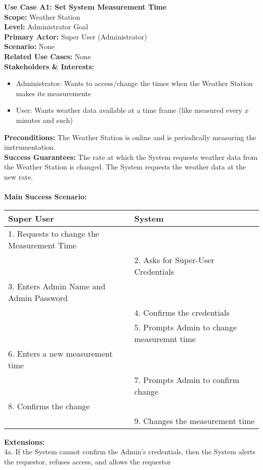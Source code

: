 \documentclass[letterpaper]{article}
\begin{document}
\noindent
\textbf{Use Case A1:  Set System Measurement Time}\\
\textbf{Scope:  }Weather Station\\
\textbf{Level:  }Administrator Goal\\
\textbf{Primary Actor:  }Super User (Administrator)\\
\textbf{Scenario:  }None\\
\textbf{Related Use Cases:  }None\\
\textbf{Stakeholders \& Interests:  }
\begin{itemize}
\item Administrator:  Wants to access/change the times when the
Weather Station makes its measurements
\item User:  Wants weather data available at a time frame (like
measured every $x$ minutes and such)
\end{itemize}
\textbf{Preconditions:  }The Weather Station is online and is
periodically measuring the instrumentation.\\
\textbf{Success Guarantees:  }The rate at which the System requests
weather data from the Weather Station is changed.  The System
requests the weather data at the new rate.\\\\ 
\textbf{Main Success Scenario:  }\\
\begin{tabular}{|p{6cm}|p{6cm}|}\hline
\textbf{Super User} & \textbf{System}\\\hline
1.  Requests to change the Measurement Time &\\\hline
& 2.  Asks for Super-User Credentials\\\hline
3.  Enters Admin Name and Admin Password & \\\hline
& 4.  Confirms the credentials\\\hline
& 5.  Prompts Admin to change measuremnt time\\\hline
6.  Enters a new measurement time & \\\hline
& 7.  Prompts Admin to confirm change\\\hline
8.  Confirms the change & \\\hline
& 9.  Changes the measurement time\\\hline
\end{tabular}
\textbf{Extensions:  }\\
4a.  If the System cannot confirm the Admin's credentials, then the
System alerts the requestor, refuses access, and allows the requestor
\end{document}
